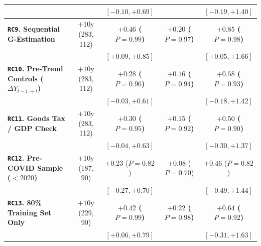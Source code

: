 \documentclass[11pt,a4paper]{article}
\newcommand{\co}{\cellcolor{colodd}}
\newcommand{\ce}{\cellcolor{coleven}}
\begin{document}
\begin{table}[htbp]
{\begin{tabular}{l|c|c|c|c}
                                                      & \co & {\scriptsize $[-0.10, +0.69]$} & \co {\scriptsize $[-0.08, +0.33]$} & {\scriptsize $[-0.19, +1.40]$} \\
    \hline
    \rowcolor{roweven}
    \textbf{\texttt{RC9}. Sequential G-Estimation} & \ce $+10\text{y}$ (283, 112) & \textbf{$+0.46$ ($P=0.99$)} & \ce \textbf{$+0.20$ ($P=0.97$)} & \textbf{$+0.85$ ($P=0.98$)} \\
    \rowcolor{roweven}
                                                      & \ce & {\scriptsize $[+0.09, +0.85]$} & \ce {\scriptsize $[-0.01, +0.41]$} & {\scriptsize $[+0.05, +1.66]$} \\
    \hline
    \rowcolor{rowodd}
    \textbf{\texttt{RC10}. Pre-Trend Controls ($\Delta Y_{t-1\to t}$)} & \co $+10\text{y}$ (283, 112) & \textbf{$+0.28$ ($P=0.96$)} & \co \textbf{$+0.16$ ($P=0.94$)} & \textbf{$+0.58$ ($P=0.93$)} \\
    \rowcolor{rowodd}
                                                      & \co & {\scriptsize $[-0.03, +0.61]$} & \co {\scriptsize $[-0.03, +0.36]$} & {\scriptsize $[-0.18, +1.42]$} \\
    \hline
    \rowcolor{roweven}
    \textbf{\texttt{RC11}. Goods Tax / GDP Check} & \ce $+10\text{y}$ (283, 112) & \textbf{$+0.30$ ($P=0.95$)} & \ce \textbf{$+0.15$ ($P=0.92$)} & \textbf{$+0.50$ ($P=0.90$)} \\
    \rowcolor{roweven}
                                                      & \ce & {\scriptsize $[-0.04, +0.63]$} & \ce {\scriptsize $[-0.06, +0.35]$} & {\scriptsize $[-0.30, +1.37]$} \\
    \hline
    \rowcolor{rowodd}
    \textbf{\texttt{RC12}. Pre-COVID Sample ($<2020$)} & \co $+10\text{y}$ (187, 90) & $+0.23$ ($P=0.82$) & \co $+0.08$ ($P=0.70$) & $+0.46$ ($P=0.82$) \\
    \rowcolor{rowodd}
                                                      & \co & {\scriptsize $[-0.27, +0.70]$} & \co {\scriptsize $[-0.20, +0.36]$} & {\scriptsize $[-0.49, +1.44]$} \\
    \hline
    \rowcolor{roweven}
    \textbf{\texttt{RC13}. 80\% Training Set Only} & \ce $+10\text{y}$ (229, 90) & \textbf{$+0.42$ ($P=0.99$)} & \ce \textbf{$+0.22$ ($P=0.98$)} & \textbf{$+0.64$ ($P=0.92$)} \\
    \rowcolor{roweven}
                                                      & \ce & {\scriptsize $[+0.06, +0.79]$} & \ce {\scriptsize $[+0.001, +0.44]$} & {\scriptsize $[-0.31, +1.63]$} \\

\end{tabular}}
\end{table}
\end{document}
